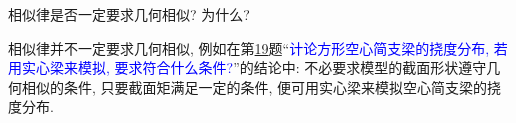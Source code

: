\begin{problem}[28]
相似律是否一定要求几何相似? 为什么?
\end{problem}
\begin{solution}
相似律并不一定要求几何相似, 例如在第\hyperref[problem:19]{19}题``\textcolor{blue}{计论方形空心简支梁的挠度分布, 若用实心梁来模拟, 要求符合什么条件?}''的结论中: 不必要求模型的截面形状遵守几何相似的条件, 只要截面矩满足一定的条件, 便可用实心梁来模拟空心简支梁的挠度分布.
\end{solution}
